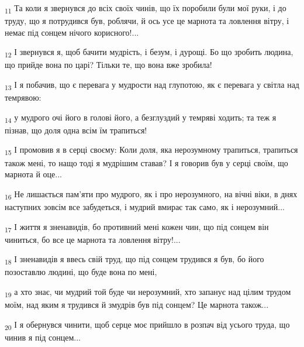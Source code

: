 \begin{tcolorbox}
\textsubscript{11} Та коли я звернувся до всіх своїх чинів, що їх поробили були мої руки, і до труду, що я потрудився був, роблячи, й ось усе це марнота та ловлення вітру, і немає під сонцем нічого корисного!...
\end{tcolorbox}
\begin{tcolorbox}
\textsubscript{12} І звернувся я, щоб бачити мудрість, і безум, і дурощі. Бо що зробить людина, що прийде вона по царі? Тільки те, що вона вже зробила!
\end{tcolorbox}
\begin{tcolorbox}
\textsubscript{13} І я побачив, що є перевага у мудрости над глупотою, як є перевага у світла над темрявою:
\end{tcolorbox}
\begin{tcolorbox}
\textsubscript{14} у мудрого очі його в голові його, а безглуздий у темряві ходить; та теж я пізнав, що доля одна всім їм трапиться!
\end{tcolorbox}
\begin{tcolorbox}
\textsubscript{15} І промовив я в серці своєму: Коли доля, яка нерозумному трапиться, трапиться також мені, то нащо тоді я мудрішим ставав? І я говорив був у серці своїм, що марнота й оце...
\end{tcolorbox}
\begin{tcolorbox}
\textsubscript{16} Не лишається пам'яти про мудрого, як і про нерозумного, на вічні віки, в днях наступних зовсім все забудеться, і мудрий вмирає так само, як і нерозумний...
\end{tcolorbox}
\begin{tcolorbox}
\textsubscript{17} І життя я зненавидів, бо противний мені кожен чин, що під сонцем він чиниться, бо все це марнота та ловлення вітру!...
\end{tcolorbox}
\begin{tcolorbox}
\textsubscript{18} І зненавидів я ввесь свій труд, що під сонцем трудився я був, бо його позоставлю людині, що буде вона по мені,
\end{tcolorbox}
\begin{tcolorbox}
\textsubscript{19} а хто знає, чи мудрий той буде чи нерозумний, хто запанує над цілим трудом моїм, над яким я трудився й змудрів був під сонцем? Це марнота також...
\end{tcolorbox}
\begin{tcolorbox}
\textsubscript{20} І я обернувся чинити, щоб серце моє прийшло в розпач від усього труда, що чинив я під сонцем...
\end{tcolorbox}
